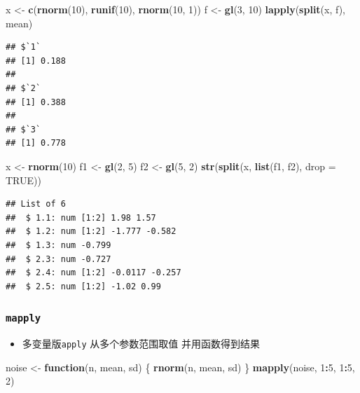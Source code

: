 \documentclass[
]{book}
\newenvironment{Shaded}{\begin{snugshade}}{\end{snugshade}}
\newcommand{\ControlFlowTok}[1]{\textcolor[rgb]{0.13,0.29,0.53}{\textbf{#1}}}
\newcommand{\DataTypeTok}[1]{\textcolor[rgb]{0.13,0.29,0.53}{#1}}
\newcommand{\DecValTok}[1]{\textcolor[rgb]{0.00,0.00,0.81}{#1}}
\newcommand{\KeywordTok}[1]{\textcolor[rgb]{0.13,0.29,0.53}{\textbf{#1}}}
\newcommand{\NormalTok}[1]{#1}
\newcommand{\OperatorTok}[1]{\textcolor[rgb]{0.81,0.36,0.00}{\textbf{#1}}}
\newcommand{\OtherTok}[1]{\textcolor[rgb]{0.56,0.35,0.01}{#1}}
\newcommand{\StringTok}[1]{\textcolor[rgb]{0.31,0.60,0.02}{#1}}
\providecommand{\tightlist}{%
  \setlength{\itemsep}{0pt}\setlength{\parskip}{0pt}}
\begin{document}
\begin{Shaded}
\begin{Highlighting}[]
\NormalTok{x <-}\StringTok{ }\KeywordTok{c}\NormalTok{(}\KeywordTok{rnorm}\NormalTok{(}\DecValTok{10}\NormalTok{), }\KeywordTok{runif}\NormalTok{(}\DecValTok{10}\NormalTok{), }\KeywordTok{rnorm}\NormalTok{(}\DecValTok{10}\NormalTok{, }\DecValTok{1}\NormalTok{))}
\NormalTok{f <-}\StringTok{ }\KeywordTok{gl}\NormalTok{(}\DecValTok{3}\NormalTok{, }\DecValTok{10}\NormalTok{)}
\KeywordTok{lapply}\NormalTok{(}\KeywordTok{split}\NormalTok{(x, f), mean)}
\end{Highlighting}
\end{Shaded}

\begin{verbatim}
## $`1`
## [1] 0.188
## 
## $`2`
## [1] 0.388
## 
## $`3`
## [1] 0.778
\end{verbatim}

\begin{Shaded}
\begin{Highlighting}[]
\NormalTok{x <-}\StringTok{ }\KeywordTok{rnorm}\NormalTok{(}\DecValTok{10}\NormalTok{)}
\NormalTok{f1 <-}\StringTok{ }\KeywordTok{gl}\NormalTok{(}\DecValTok{2}\NormalTok{, }\DecValTok{5}\NormalTok{)}
\NormalTok{f2 <-}\StringTok{ }\KeywordTok{gl}\NormalTok{(}\DecValTok{5}\NormalTok{, }\DecValTok{2}\NormalTok{)}
\KeywordTok{str}\NormalTok{(}\KeywordTok{split}\NormalTok{(x, }\KeywordTok{list}\NormalTok{(f1, f2), }\DataTypeTok{drop =} \OtherTok{TRUE}\NormalTok{))}
\end{Highlighting}
\end{Shaded}

\begin{verbatim}
## List of 6
##  $ 1.1: num [1:2] 1.98 1.57
##  $ 1.2: num [1:2] -1.777 -0.582
##  $ 1.3: num -0.799
##  $ 2.3: num -0.727
##  $ 2.4: num [1:2] -0.0117 -0.257
##  $ 2.5: num [1:2] -1.02 0.99
\end{verbatim}

\hypertarget{mapply}{%
\subsubsection{\texorpdfstring{\texttt{mapply}}{mapply}}\label{mapply}}

\begin{itemize}
\tightlist
\item
  多变量版\texttt{apply} 从多个参数范围取值 并用函数得到结果
\end{itemize}

\begin{Shaded}
\begin{Highlighting}[]
\NormalTok{noise <-}\StringTok{ }\ControlFlowTok{function}\NormalTok{(n, mean, sd) \{}
  \KeywordTok{rnorm}\NormalTok{(n, mean, sd)}
\NormalTok{\}}
\KeywordTok{mapply}\NormalTok{(noise, }\DecValTok{1}\OperatorTok{:}\DecValTok{5}\NormalTok{, }\DecValTok{1}\OperatorTok{:}\DecValTok{5}\NormalTok{, }\DecValTok{2}\NormalTok{)}
\end{Highlighting}
\end{Shaded}
\end{document}
